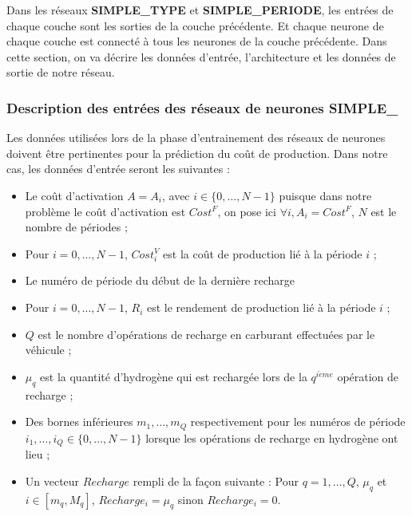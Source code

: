 Dans les réseaux \textbf{SIMPLE\_TYPE} et \textbf{SIMPLE\_PERIODE}, les entrées de chaque couche sont les sorties de la couche précédente. Et chaque neurone de chaque couche est connecté à tous les neurones de la couche précédente.
Dans cette section, on va décrire les données d'entrée, l'architecture et les données de sortie de notre réseau.

\subsubsection{Description des entrées des réseaux de neurones \textbf{SIMPLE\_}}


Les données utilisées lors de la phase d'entrainement des réseaux de neurones doivent être pertinentes pour la prédiction du coût de production. Dans notre cas, les données d'entrée seront les suivantes :
\begin{itemize}[label=$\square$]
\item  Le coût d'activation $A=A_i$, avec $i \in \{0, \dots, N-1\}$ puisque dans notre problème le coût d'activation est $Cost^F$, on pose ici $\forall i, A_i=Cost^F$, $N$ est le nombre de périodes ;

\item Pour $i=0, \dots, N-1$, $Cost_i^V$ est la coût de production lié à la période $i$ ;
\item Le numéro de période du début de la dernière recharge
\item Pour $i=0, \dots, N-1$, $R_i$ est le rendement de production lié à la période $i$ ;
\item $Q$ est le nombre d'opérations de recharge en carburant effectuées par le véhicule ;
\item $\mu_q$ est la quantité d'hydrogène qui est rechargée lors de la $q^{i\grave eme}$ opération de recharge ;
\item Des bornes inférieures $m_1, \dots,m_Q$ respectivement pour les numéros de période $i_1, \dots, i_Q\in \{0, \dots, N-1\}$ lorsque les opérations de recharge en hydrogène ont lieu ; 

\item  Un vecteur $Recharge$ rempli de la façon suivante : Pour $q=1, \dots, Q$, $\mu_q$ et $i \in [m_q,M_q]$, $Recharge_i=\mu_q$ sinon $Recharge_i=0$. 

\end{itemize}


